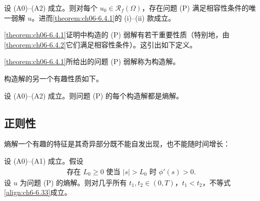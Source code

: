 \documentclass[../../main.tex]{subfiles}%
\begin{document}
\begin{theorem}\label{theorem:ch06-6.4.3}
设 (A0)--(A2) 成立。则对每个 $u_0\in\mathscr{R}_f(\Omega)$，存在问题 (P) 满足相容性条件的唯一弱解 $u$。进而\cref{theorem:ch06-6.4.1}的 (i)--(ii) 款成立。
\end{theorem}

\cref{theorem:ch06-6.4.1}证明中构造的 (P) 弱解有若干重要性质（特别地，由\cref{theorem:ch06-6.4.2}它们满足相容性条件）。这引出如下定义。

\begin{definition}\label{definition:ch06-构造解}
\cref{theorem:ch06-6.4.1}所给出的问题 (P) 弱解称为构造解。
\end{definition}

构造解的另一个有趣性质如下。

\begin{proposition}\label{proposition:ch06-6.4.4}
设 (A0)--(A2) 成立。则问题 (P) 的每个构造解都是熵解。
\end{proposition}

\subsection{正则性}\label{subsection:ch06-正则性}

熵解一个有趣的特征是其奇异部分既不能自发出现，也不能随时间增长：

\begin{theorem}\label{theorem:ch06-6.4.5}
设 (A0)--(A1) 成立。假设
\begin{align}
\text{存在 }L_0\geqslant0\text{ 使当 }|s|>L_0\text{ 时 }\phi'(s)>0. \label{align:ch6-6.34}
\end{align}
设 $u$ 为问题 (P) 的熵解。则对几乎所有 $t_1,t_2\in(0,T)$，$t_1<t_2$，不等式\eqref{align:ch6-6.33}成立。
\end{theorem}
\end{document}
